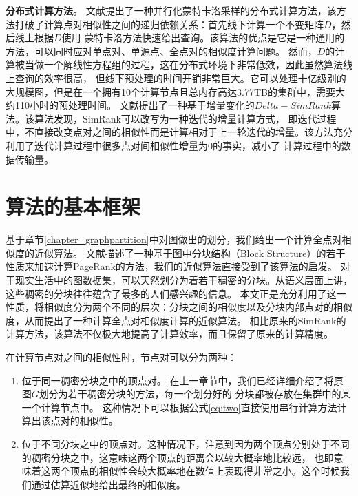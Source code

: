 \documentclass[master]{njuthesis}
\begin{document}
\textbf{分布式计算方法}。 文献\cite{DBLP:journals/pvldb/LiFLCCL15}提出了一种并行化蒙特卡洛采样的分布式计算方法，该方法打破了计算点对相似性之间的递归依赖关系：首先线下计算一个不变矩阵$D$，然后线上根据$D$使用
蒙特卡洛方法快速给出查询。该算法的优点是它是一种通用的方法，可以同时应对单点对、单源点、全点对的相似度计算问题。
然而，$D$的计算被当做一个解线性方程组的过程，这在分布式环境下非常低效，因此虽然算法线上查询的效率很高，
但线下预处理的时间开销非常巨大。它可以处理十亿级别的大规模图，但是在一个拥有10个计算节点且总内存高达3.77TB的集群中，需要大约110小时的预处理时间。
文献\cite{yu2013towards}提出了一种基于增量变化的$Delta-SimRank$算法。该算法发现，SimRank可以改写为一种迭代的增量计算方式，
即迭代过程中，不直接改变点对之间的相似性而是计算相对于上一轮迭代的增量。该方法充分利用了迭代计算过程中很多点对间相似性增量为0的事实，减小了
计算过程中的数据传输量。

\section{算法的基本框架}
基于章节\ref{chapter_graphpartition}中对图做出的划分，我们给出一个计算全点对相似度的近似算法。
文献\cite{ilprints579}描述了一种基于图中分块结构（Block Structure）的若干性质来加速计算PageRank的方法，我们的近似算法直接受到了该算法的启发。
对于现实生活中的图数据集，可以天然划分为着若干稠密的分块。从语义层面上讲，这些稠密的分块往往蕴含了最多的人们感兴趣的信息。
本文正是充分利用了这一性质，将相似度分为两个不同的层次：分块之间的相似度以及分块内部点对的相似度，从而提出了一种计算全点对相似度计算的近似算法。
相比原来的SimRank的计算方法，该算法不仅极大地提高了计算效率，而且保留了原来的计算精度。

在计算节点对之间的相似性时，节点对可以分为两种：
\begin{enumerate}
 \item 位于同一稠密分块之中的顶点对。 在上一章节中，我们已经详细介绍了将原图$G$划分为若干稠密分块的方法，每一个划分好的
 分块都被存放在集群中的某一个计算节点中。 这种情况下可以根据公式\ref{eq:two}直接使用串行计算方法计算出该点对的相似性。
 \item 位于不同分块之中的顶点对。这种情况下，注意到因为两个顶点分别处于不同的稠密分块之中，这意味这两个顶点的距离会以较大概率地比较远，
 也即意味着这两个顶点的相似性会较大概率地在数值上表现得非常之小。这个时候我们通过估算近似地给出最终的相似度。
\end{enumerate}
\end{document}
